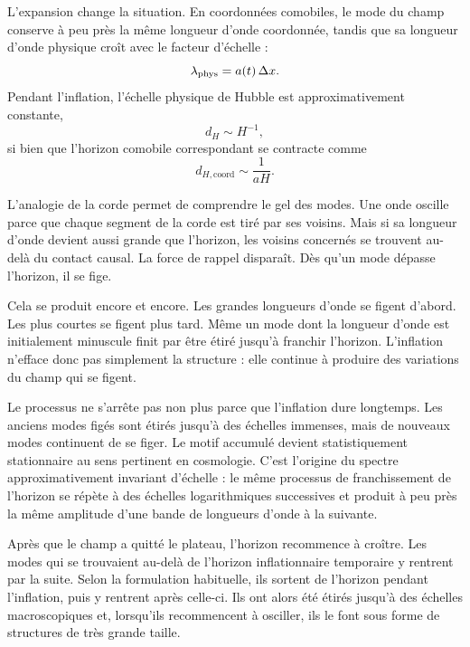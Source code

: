 L’expansion change la situation. En coordonnées comobiles, le mode du champ conserve à peu près la même longueur d’onde coordonnée, tandis que sa longueur d’onde physique croît avec le facteur d’échelle :
\begin{equation}
\lambda_{\rm phys}=a(t)\,\Delta x.
\end{equation}
Pendant l’inflation, l’échelle physique de Hubble est approximativement constante,
\begin{equation}
d_H\sim H^{-1},
\end{equation}
si bien que l’horizon comobile correspondant se contracte comme
\begin{equation}
d_{H,\mathrm{coord}}\sim \frac{1}{aH}.
\end{equation}

L’analogie de la corde permet de comprendre le gel des modes. Une onde oscille parce que chaque segment de la corde est tiré par ses voisins. Mais si sa longueur d’onde devient aussi grande que l’horizon, les voisins concernés se trouvent au-delà du contact causal. La force de rappel disparaît. Dès qu’un mode dépasse l’horizon, il se fige.

Cela se produit encore et encore. Les grandes longueurs d’onde se figent d’abord. Les plus courtes se figent plus tard. Même un mode dont la longueur d’onde est initialement minuscule finit par être étiré jusqu’à franchir l’horizon. L’inflation n’efface donc pas simplement la structure : elle continue à produire des variations du champ qui se figent.

Le processus ne s’arrête pas non plus parce que l’inflation dure longtemps. Les anciens modes figés sont étirés jusqu’à des échelles immenses, mais de nouveaux modes continuent de se figer. Le motif accumulé devient statistiquement stationnaire au sens pertinent en cosmologie. C’est l’origine du spectre approximativement invariant d’échelle : le même processus de franchissement de l’horizon se répète à des échelles logarithmiques successives et produit à peu près la même amplitude d’une bande de longueurs d’onde à la suivante.

Après que le champ a quitté le plateau, l’horizon recommence à croître. Les modes qui se trouvaient au-delà de l’horizon inflationnaire temporaire y rentrent par la suite. Selon la formulation habituelle, ils sortent de l’horizon pendant l’inflation, puis y rentrent après celle-ci. Ils ont alors été étirés jusqu’à des échelles macroscopiques et, lorsqu’ils recommencent à osciller, ils le font sous forme de structures de très grande taille.


